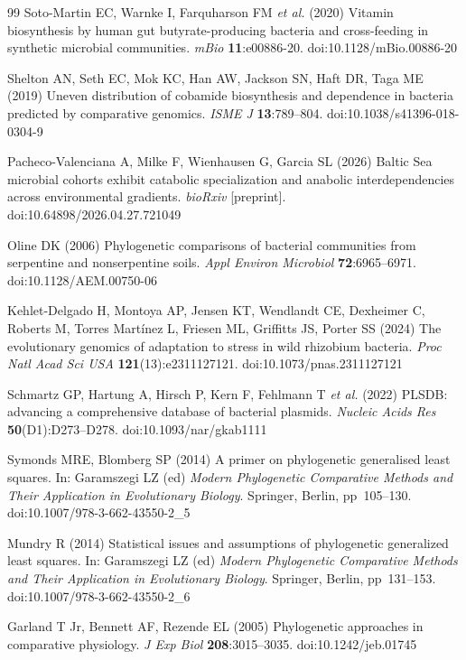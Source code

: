 \documentclass[times]{zHenriquesLab-StyleBioRxiv}
\begin{document}
\begin{thebibliography}{99}
Soto-Martin EC, Warnke I, Farquharson FM \textit{et al.} (2020) Vitamin
biosynthesis by human gut butyrate-producing bacteria and cross-feeding in
synthetic microbial communities. \textit{mBio} \textbf{11}:e00886-20.
doi:10.1128/mBio.00886-20

Shelton AN, Seth EC, Mok KC, Han AW, Jackson SN, Haft DR, Taga ME (2019)
Uneven distribution of cobamide biosynthesis and dependence in bacteria
predicted by comparative genomics. \textit{ISME J} \textbf{13}:789--804.
doi:10.1038/s41396-018-0304-9

Pacheco-Valenciana A, Milke F, Wienhausen G, Garcia SL (2026) Baltic Sea
microbial cohorts exhibit catabolic specialization and anabolic
interdependencies across environmental gradients. \textit{bioRxiv} [preprint].
doi:10.64898/2026.04.27.721049

Oline DK (2006) Phylogenetic comparisons of bacterial communities from
serpentine and nonserpentine soils. \textit{Appl Environ Microbiol}
\textbf{72}:6965--6971. doi:10.1128/AEM.00750-06

Kehlet-Delgado H, Montoya AP, Jensen KT, Wendlandt CE, Dexheimer C, Roberts M,
Torres Martínez L, Friesen ML, Griffitts JS, Porter SS (2024) The evolutionary
genomics of adaptation to stress in wild rhizobium bacteria. \textit{Proc Natl
Acad Sci USA} \textbf{121}(13):e2311127121. doi:10.1073/pnas.2311127121

Schmartz GP, Hartung A, Hirsch P, Kern F, Fehlmann T \textit{et al.} (2022)
PLSDB: advancing a comprehensive database of bacterial plasmids.
\textit{Nucleic Acids Res} \textbf{50}(D1):D273--D278.
doi:10.1093/nar/gkab1111

Symonds MRE, Blomberg SP (2014) A primer on phylogenetic generalised least
squares. In: Garamszegi LZ (ed) \textit{Modern Phylogenetic Comparative Methods
and Their Application in Evolutionary Biology}. Springer, Berlin,
pp~105--130. doi:10.1007/978-3-662-43550-2\_5

Mundry R (2014) Statistical issues and assumptions of phylogenetic generalized
least squares. In: Garamszegi LZ (ed) \textit{Modern Phylogenetic Comparative
Methods and Their Application in Evolutionary Biology}. Springer, Berlin,
pp~131--153. doi:10.1007/978-3-662-43550-2\_6

Garland T Jr, Bennett AF, Rezende EL (2005) Phylogenetic approaches in
comparative physiology. \textit{J Exp Biol} \textbf{208}:3015--3035.
doi:10.1242/jeb.01745

\end{thebibliography}
\end{document}
